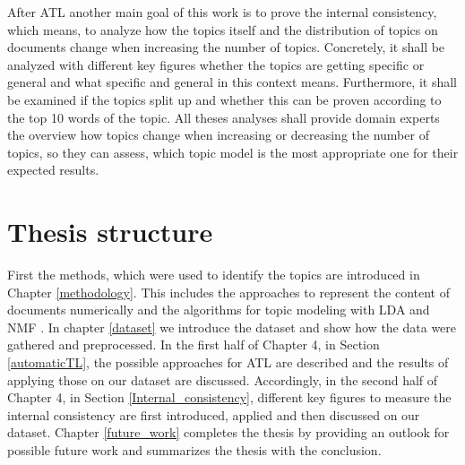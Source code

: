 After \ac{ATL} another main goal of this work is to prove the internal consistency, which means, to analyze how the topics itself and the distribution of topics on documents change when increasing the number of topics. Concretely, it shall be analyzed with different key figures whether the topics are getting specific or general and what specific and general in this context means. Furthermore, it shall be examined if the topics split up and whether this can be proven according to the top 10 words of the topic. All theses analyses shall provide domain experts the overview how topics change when increasing or decreasing the number of topics, so they can assess, which topic model is the most appropriate one for their expected results.
\section{Thesis structure}
First the methods, which were used to identify the topics are introduced in Chapter \ref{methodology}. This includes the approaches to represent the content of documents numerically and the algorithms for topic modeling with \acf{LDA} and \acf{NMF} .
In chapter \ref{dataset} we introduce the dataset and show how the data were gathered and preprocessed.
In the first half of Chapter 4, in Section \ref{automaticTL}, the possible approaches for \acl{ATL} are described and the results of applying those on our dataset are discussed. Accordingly, in the second half of Chapter 4, in Section \ref{Internal_consistency}, different key figures to measure the internal consistency are first introduced, applied and then discussed on our dataset.
Chapter \ref{future_work} completes the thesis by providing an outlook for possible future work and summarizes the thesis with the conclusion.

\newpage